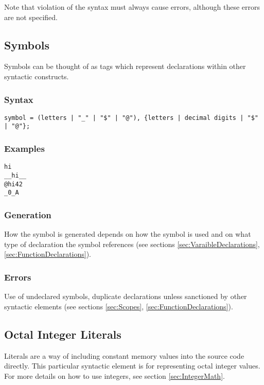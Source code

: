 \documentclass[10pt,a4paper]{article}
\begin{document}
Note that violation of the syntax must always cause errors, although these errors are not specified.

\newpage




\subsection{Symbols}
\label{sec:Symbols}
Symbols can be thought of as tags which represent declarations within other syntactic constructs.

\subsubsection{Syntax}
\begin{verbatim}
symbol = (letters | "_" | "$" | "@"), {letters | decimal digits | "$" | "@"};
\end{verbatim}

\subsubsection{Examples}
\begin{verbatim}
hi
__hi__
@hi42
_0_A
\end{verbatim}

\subsubsection{Generation}
How the symbol is generated depends on how the symbol is used and on what type of declaration the symbol references (see sections \ref{sec:VaraibleDeclarations}, \ref{sec:FunctionDeclarations}).

\subsubsection{Errors}
Use of undeclared symbols, duplicate declarations unless sanctioned by other syntactic elements (see sections \ref{sec:Scopes}, \ref{sec:FunctionDeclarations}). 

\newpage




\subsection{Octal Integer Literals}
\label{sec:OctalIntegerLiterals}
Literals are a way of including constant memory values into the source code directly. This particular syntactic element is for representing octal integer values. For more details on how to use integers, see section \ref{sec:IntegerMath}.
\end{document}
